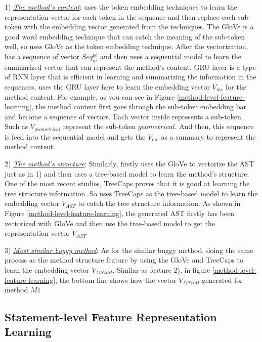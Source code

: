 1) {\em \underline{The method's content}}: \tool uses the token embedding techniques to learn the representation vector for each token in the sequence and then replace each sub-token with the embedding vector generated from the techniques. The GloVe \cite{pennington2014glove} is a good word embedding technique that can catch the meaning of the sub-token well, so \tool uses GloVe as the token embedding technique. After the vectorization, \tool has a sequence of vector $Seq^{pe}_m$ and then uses a sequential model to learn the summarized vector that can represent the method's content.  GRU layer \cite{cho2014learning} is a type of RNN layer that is efficient in learning and summarizing the information in the sequences. \tool uses the GRU layer here to learn the embedding vector $V_{mc}$ for the method content. For example, as you can see in Figure \ref{method-level-feature-learning}, the method content first goes through the sub-token embedding bar and become a sequence of vectors. Each vector inside represents a sub-token. Such as $V_{geometrical}$ represent the sub-token $geometrical$. And then, this sequence is feed into the sequential model and gets the $V_{mc}$ as a summary to represent the method content.

2) {\em \underline{The method's structure}}: Similarly, \tool firstly uses the GloVe to vectorize the AST just as in 1) and then uses a tree-based model to learn the method's structure. One of the most recent studies, TreeCaps \cite{bui2021treecaps} proves that it is good at learning the tree structure information. So \tool uses TreeCaps as the tree-based model to learn the embedding vector $V_{AST}$ to catch the tree structure information. As shown in Figure \ref{method-level-feature-learning}, the generated AST firstly has been vectorized with GloVe and then use the tree-based model to get the representation vector $V_{AST}$

3) {\em \underline{Most similar buggy method}}: As for the similar buggy method, \tool doing the same process as the method structure feature by using the GloVe and TreeCaps to learn the embedding vector $V_{MSBM}$. Similar as feature 2), in figure \ref{method-level-feature-learning}, the bottom line shows how the vector $V_{MSBM}$ generated for method $M1$

\subsection{Statement-level Feature Representation Learning}

